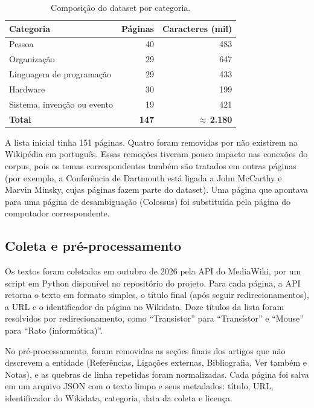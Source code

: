 \begin{table}[ht]
\centering
\caption{Composição do dataset por categoria.}
\label{tab:dataset}
\begin{tabular}{lrr}
\toprule
\textbf{Categoria} & \textbf{Páginas} & \textbf{Caracteres (mil)} \\
\midrule
Pessoa                     & 40  & 483   \\
Organização                & 29  & 647   \\
Linguagem de programação   & 29  & 433   \\
Hardware                   & 30  & 199   \\
Sistema, invenção ou evento & 19 & 421   \\
\midrule
\textbf{Total}             & \textbf{147} & \textbf{$\approx$\,2.180} \\
\bottomrule
\end{tabular}
\end{table}

A lista inicial tinha 151 páginas. Quatro foram removidas por não existirem na Wikipédia em português.
Essas remoções tiveram pouco impacto nas conexões do corpus, pois os temas correspondentes também são tratados em outras páginas (por exemplo, a Conferência de Dartmouth está ligada a John McCarthy e Marvin Minsky, cujas páginas fazem parte do dataset). Uma página que apontava para uma página de desambiguação (Colossus) foi substituída pela página do computador correspondente.

\subsection{Coleta e pré-processamento}

Os textos foram coletados em outubro de 2026 pela API do MediaWiki, por um script em Python disponível no repositório do projeto. Para cada página, a API retorna o texto em formato simples, o título final (após seguir redirecionamentos), a URL e o identificador da página no Wikidata. Doze títulos da lista foram resolvidos por redirecionamento, como ``Transistor'' para ``Transístor'' e ``Mouse'' para ``Rato (informática)''.

No pré-processamento, foram removidas as seções finais dos artigos que não descrevem a entidade (Referências, Ligações externas, Bibliografia, Ver também e Notas), e as quebras de linha repetidas foram normalizadas. Cada página foi salva em um arquivo JSON com o texto limpo e seus metadados: título, URL, identificador do Wikidata, categoria, data da coleta e licença.


